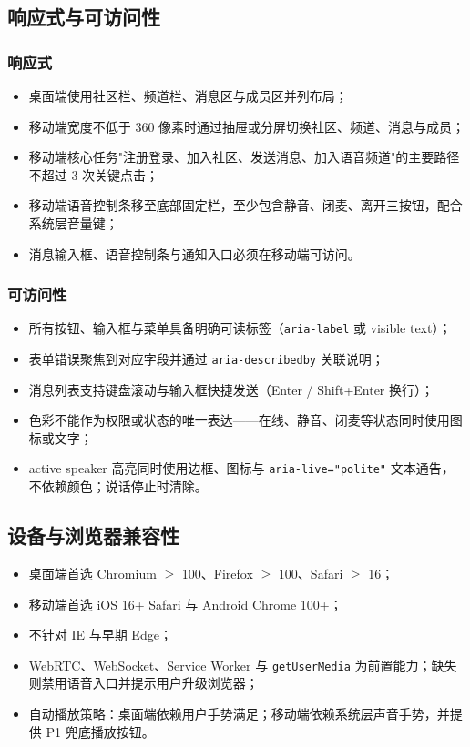 \subsection{响应式与可访问性}

\subsubsection{响应式}
\begin{itemize}
  \item 桌面端使用社区栏、频道栏、消息区与成员区并列布局；
  \item 移动端宽度不低于 360 像素时通过抽屉或分屏切换社区、频道、消息与成员；
  \item 移动端核心任务"注册登录、加入社区、发送消息、加入语音频道"的主要路径不超过 3 次关键点击；
  \item 移动端语音控制条移至底部固定栏，至少包含静音、闭麦、离开三按钮，配合系统层音量键；
  \item 消息输入框、语音控制条与通知入口必须在移动端可访问。
\end{itemize}

\subsubsection{可访问性}
\begin{itemize}
  \item 所有按钮、输入框与菜单具备明确可读标签（\texttt{aria-label} 或 visible text）；
  \item 表单错误聚焦到对应字段并通过 \texttt{aria-describedby} 关联说明；
  \item 消息列表支持键盘滚动与输入框快捷发送（Enter / Shift+Enter 换行）；
  \item 色彩不能作为权限或状态的唯一表达——在线、静音、闭麦等状态同时使用图标或文字；
  \item active speaker 高亮同时使用边框、图标与 \texttt{aria-live="polite"} 文本通告，不依赖颜色；说话停止时清除。
\end{itemize}

\subsection{设备与浏览器兼容性}

\begin{itemize}
  \item 桌面端首选 Chromium $\geq$ 100、Firefox $\geq$ 100、Safari $\geq$ 16；
  \item 移动端首选 iOS 16+ Safari 与 Android Chrome 100+；
  \item 不针对 IE 与早期 Edge；
  \item WebRTC、WebSocket、Service Worker 与 \texttt{getUserMedia} 为前置能力；缺失则禁用语音入口并提示用户升级浏览器；
  \item 自动播放策略：桌面端依赖用户手势满足；移动端依赖系统层声音手势，并提供 P1 兜底播放按钮。
\end{itemize}

